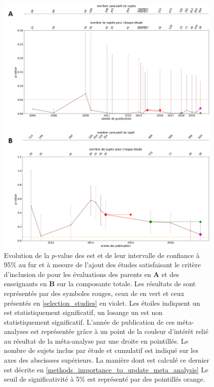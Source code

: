 \begin{figure}[h!]
  \centering
	\includegraphics[width=1\linewidth]{figures/chapter-2/meta-analysis-evolution-pvalue-total} 
  \caption{Evolution de la $p$-value des \gls{est} et de leur intervalle de confiance à 95\% au fur et à mesure de l'ajout des études satisfaisant le critère d'inclusion de \citet{Cortese2016} pour les évaluations des 
	parents en \textbf{A} et des enseignants en \textbf{B} sur la composante totale.
  Les résultats de \citep{Cortese2016} sont représentés par des symboles rouges, ceux de \citet{Bussalb2016clinical} en vert et ceux présentés en \ref{selection_studies} en violet. Les étoiles 
	indiquent un \gls{est} statistiquement significatif, un losange un \gls{est} non statistiquement significatif. L'année de publication de ces méta-analyses est représentée grâce à un point de la couleur 
	d'intérêt relié au résultat de la méta-analyse par une droite en pointillés.
	Le nombre de sujets inclus par étude et cumulatif est indiqué sur les axes des abscissses supérieurs. La manière dont est calculé ce dernier est 
	décrite en \ref{methods_importance_to_update_meta_analysis}
	Le seuil de significativité à 5\% est représenté par des pointillés orange.}
  \label{Figure:meta_analysis_evolution_pvalue_total}
\end{figure}

